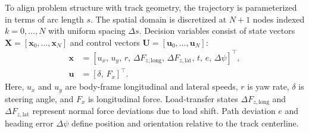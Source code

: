 \documentclass{article}
\begin{document}
To align problem structure with track geometry, the trajectory is parameterized in terms of arc length $s$. The spatial domain is discretized at $N{+}1$ nodes indexed $k=0,\dots,N$ with uniform spacing $\Delta s$. Decision variables consist of state vectors $\mathbf{X}=[\mathbf{x}_0,\dots,\mathbf{x}_N]$ and control vectors $\mathbf{U}=[\mathbf{u}_0,\dots,\mathbf{u}_N]$:
\begin{equation}
\begin{aligned}
\mathbf{x} &= [u_x,\,u_y,\,r,\,\Delta F_{z,\text{long}},\,\Delta F_{z,\text{lat}},\,t,\,e,\,\Delta\psi]^\top,\\
\mathbf{u} &= [\delta,\,F_x]^\top.
\end{aligned}
\end{equation}
Here, $u_x$ and $u_y$ are body-frame longitudinal and lateral speeds, $r$ is yaw rate, $\delta$ is steering angle, and $F_x$ is longitudinal force. Load-transfer states $\Delta F_{z,\text{long}}$ and $\Delta F_{z,\text{lat}}$ represent normal force deviations due to load shift. Path deviation $e$ and heading error $\Delta\psi$ define position and orientation relative to the track centerline.


\end{document}
